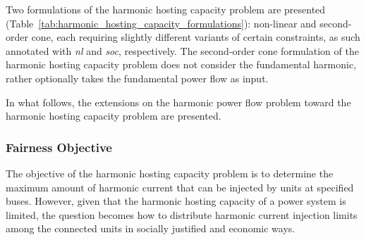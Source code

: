 Two formulations of the harmonic hosting capacity problem are presented (Table~\ref{tab:harmonic_hosting_capacity_formulations}): non-linear and second-order cone, each requiring slightly different variants of certain constraints, as such annotated with \textit{nl} and \textit{soc}, respectively. The second-order cone formulation of the harmonic hosting capacity problem does not consider the fundamental harmonic, rather optionally takes the fundamental power flow as input.

In what follows, the extensions on the harmonic power flow problem toward the harmonic hosting capacity problem are presented. 

\subsubsection{Fairness Objective}

The objective of the harmonic hosting capacity problem is to determine the maximum amount of harmonic current that can be injected by units at specified buses. However, given that the harmonic hosting capacity of a power system is limited, the question becomes how to distribute harmonic current injection limits among the connected units in socially justified and economic ways. 

